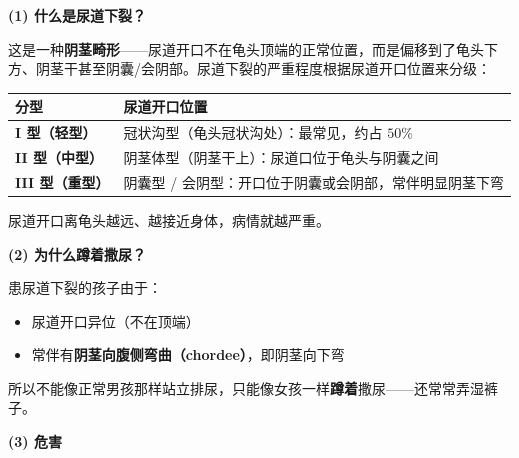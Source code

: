 \vspace{0.5em}
\noindent\textbf{(1) 什么是尿道下裂？}

这是一种\textbf{阴茎畸形}——尿道开口不在龟头顶端的正常位置，而是偏移到了龟头下方、阴茎干甚至阴囊/会阴部。尿道下裂的严重程度根据尿道开口位置来分级：

\begin{tabular}{|p{4cm}|p{9cm}|}
\hline
\textbf{分型} & \textbf{尿道开口位置} \\
\hline
\textbf{I 型（轻型）} & 冠状沟型（龟头冠状沟处）：最常见，约占 $50\%$ \\
\hline
\textbf{II 型（中型）} & 阴茎体型（阴茎干上）：尿道口位于龟头与阴囊之间 \\
\hline
\textbf{III 型（重型）} & 阴囊型 / 会阴型：开口位于阴囊或会阴部，常伴明显阴茎下弯 \\
\hline
\end{tabular}

尿道开口离龟头越远、越接近身体，病情就越严重。

\vspace{0.3em}
\noindent\textbf{(2) 为什么蹲着撒尿？}

患尿道下裂的孩子由于：
\begin{itemize}
	\item 尿道开口异位（不在顶端）
	\item 常伴有\textbf{阴茎向腹侧弯曲（chordee）}，即阴茎向下弯
\end{itemize}
所以不能像正常男孩那样站立排尿，只能像女孩一样\textbf{蹲着}撒尿——还常常弄湿裤子。

\vspace{0.3em}
\noindent\textbf{(3) 危害}

